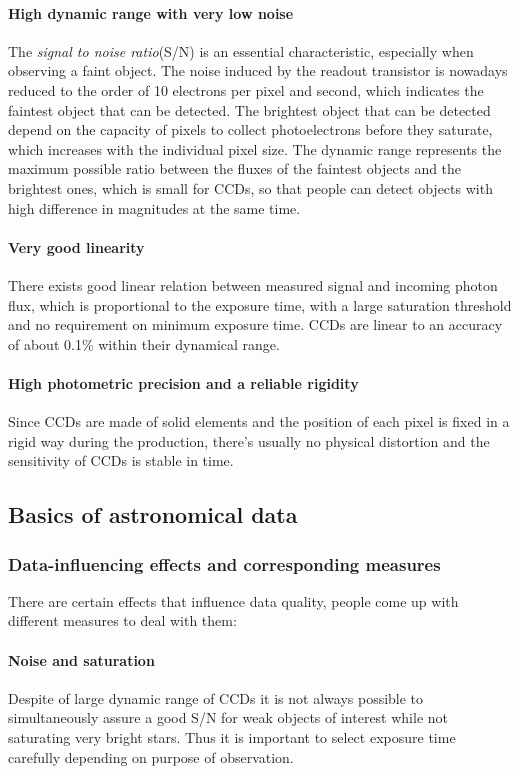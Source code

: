 \paragraph{High dynamic range with very low noise}
  The \textit{signal to noise ratio}(S/N) is an essential characteristic, especially when observing a faint object. The noise induced by the readout transistor is nowadays reduced to the order of 10 electrons per pixel and second, which indicates the faintest object that can be detected. The brightest object that can be detected depend on the  capacity of pixels to collect photoelectrons before they saturate, which increases with the individual pixel size. The dynamic range represents the maximum possible ratio between the fluxes of the faintest objects and the brightest ones, which is small for CCDs, so that people can detect objects with high difference in magnitudes at the same time. 
  
\paragraph{Very good linearity}
  There exists good linear relation between measured signal and incoming photon flux, which is proportional to the exposure time, with a large saturation threshold and no requirement on minimum exposure time. CCDs are linear to an accuracy of about 0.1\% within their dynamical range.
  
\paragraph{High photometric precision and a reliable rigidity}
  Since CCDs are made of solid elements and the position of each pixel is fixed in a rigid way during the production, there's usually no physical distortion and the sensitivity of CCDs is stable in time.

\subsection{Basics of astronomical data} \label{astrodata}
\subsubsection{Data-influencing effects and corresponding measures}
There are certain effects that influence data quality, people come up with different measures to deal with them:
\paragraph{Noise and saturation}
Despite of large dynamic range of CCDs it is not always possible to simultaneously assure a good S/N for weak objects of interest while not saturating very bright stars. Thus it is important to select exposure time carefully depending on purpose of observation.

